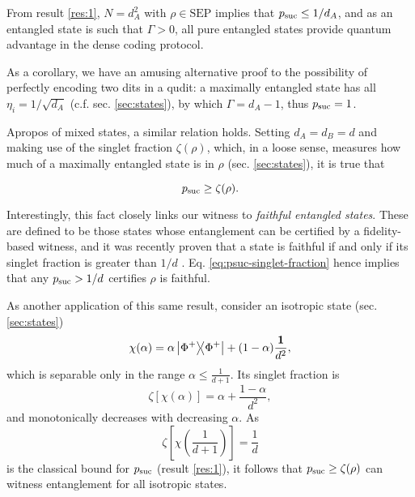         From result \ref{res:1}, $N = d_A^2$ with $\rho \in \text{SEP}$ implies that $p_{\text{suc}} \leq 1 / d_A$, and as an entangled state is such that $\Gamma > 0$, all pure entangled states provide quantum advantage in the dense coding protocol.
        
        As a corollary, we have an amusing alternative proof to the possibility of perfectly encoding two dits in a qudit: a maximally entangled state has all $\eta_i = 1 / \sqrt{d_A}$ (c.f. sec. \ref{sec:states}), by which $\Gamma = d_A - 1$, thus $p_{\text{suc}} = 1$.
        
        Apropos of mixed states, a similar relation holds. Setting $d_A = d_B = d$ and making use of the singlet fraction $\zeta(\rho)$, which, in a loose sense, measures how much of a maximally entangled state is in $\rho$ (sec. \ref{sec:states}), it is true that
        \begin{result}
           \begin{equation}
                p_{\text{suc}} \geq \zeta(\rho) .
                \label{eq:psuc-singlet-fraction}
            \end{equation}
        \end{result}

        Interestingly, this fact closely links our witness to \emph{faithful entangled states}. These are defined to be those states whose entanglement can be certified by a fidelity-based witness, and it was recently proven that a state is faithful if and only if its singlet fraction is greater than $1/d$ \cite{guhne_faithful_2021}. Eq. \ref{eq:psuc-singlet-fraction} hence implies that any $p_{\text{suc}} > 1/d$ certifies $\rho$ is faithful. 
 
        As another application of this same result, consider an isotropic state (sec. \ref{sec:states})
        $$
            \chi(\alpha) = \alpha \ketbra{\Phi^+}{\Phi^+} + (1 - \alpha) \frac{\mathbf{1}}{d^2} ,
        $$
        which is separable only in the range $\alpha \leq \frac{1}{d + 1}$. Its singlet fraction is
        $$
            \zeta\left[ \chi(\alpha) \right] = \alpha + \frac{1 - \alpha}{d^2} ,
        $$
        and monotonically decreases with decreasing $\alpha$. As
        $$
            \zeta \left[ \chi \left( \frac{1}{d + 1} \right) \right] = \frac{1}{d}
        $$
        is the classical bound for $p_{\text{suc}}$ (result \ref{res:1}), it follows that $p_{\text{suc}} \geq \zeta(\rho)$ can witness entanglement for all isotropic states.        

